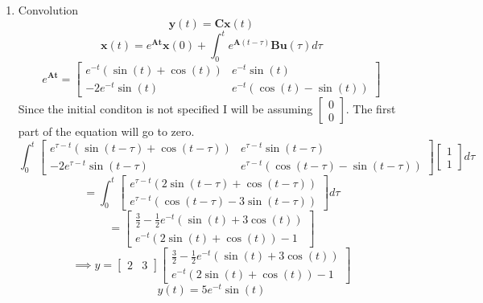 \documentclass{article}
\begin{document}
\begin{enumerate}[1.]
\item Convolution
$$ \mathbf{y}(t) = \mathbf{C}\mathbf{x}(t) $$
$$ \mathbf{x}(t)
=
e^{\mathbf{At}}\mathbf{x}(0) + \int_0^t e^{\mathbf{A}(t-\tau)}\mathbf{B}\mathbf{u}(\tau) d\tau
$$
$$
e^{\mathbf{At}} =
\begin{bmatrix}
e^{-t} (\sin (t)+\cos (t)) & e^{-t} \sin (t) \\
-2 e^{-t} \sin (t) & e^{-t} (\cos (t)-\sin (t))
\end{bmatrix}
$$
Since the initial conditon is not specified I will be assuming $\begin{bmatrix} 0 \\ 0 \end{bmatrix}$.
The first part of the equation will go to zero.
$$
\int_0^t
\begin{bmatrix}
e^{\tau - t} (\sin (t-\tau)+\cos (t-\tau)) & e^{\tau - t} \sin (t-\tau) \\
-2 e^{\tau - t} \sin (t-\tau) & e^{\tau - t} (\cos (t-\tau)-\sin (t-\tau))
\end{bmatrix}
\begin{bmatrix}
1\\
1
\end{bmatrix}
d\tau
$$
$$
=
\int_0^t
\begin{bmatrix}
e^{\tau -t} (2 \sin (t-\tau )+\cos (t-\tau )) \\
e^{\tau -t} (\cos (t-\tau )-3 \sin (t-\tau ))
\end{bmatrix}
d\tau
$$
$$
=
\begin{bmatrix}
\frac{3}{2}-\frac{1}{2} e^{-t} (\sin (t)+3 \cos (t)) \\
e^{-t} (2 \sin (t)+\cos (t))-1
\end{bmatrix}
$$
$$
\implies
y
=
\begin{bmatrix} 2 & 3 \end{bmatrix}
\begin{bmatrix}
\frac{3}{2}-\frac{1}{2} e^{-t} (\sin (t)+3 \cos (t)) \\
e^{-t} (2 \sin (t)+\cos (t))-1
\end{bmatrix}
$$
$$
y(t)
=
5 e^{-t} \sin (t)
$$



\end{enumerate}
\end{document}
